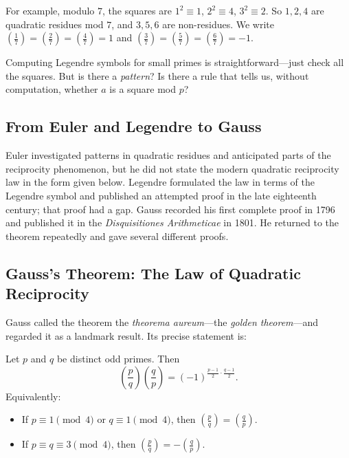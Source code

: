 For example, modulo $7$, the squares are $1^2 \equiv 1$, $2^2 \equiv 4$, $3^2 \equiv 2$. So $1, 2, 4$ are quadratic residues mod $7$, and $3, 5, 6$ are non-residues. We write $\left(\frac{1}{7}\right) = \left(\frac{2}{7}\right) = \left(\frac{4}{7}\right) = 1$ and $\left(\frac{3}{7}\right) = \left(\frac{5}{7}\right) = \left(\frac{6}{7}\right) = -1$.

Computing Legendre symbols for small primes is straightforward---just check all the squares. But is there a \emph{pattern}? Is there a rule that tells us, without computation, whether $a$ is a square mod $p$?

\subsection{From Euler and Legendre to Gauss}

Euler investigated patterns in quadratic residues and anticipated parts of the reciprocity phenomenon, but he did not state the modern quadratic reciprocity law in the form given below. Legendre formulated the law in terms of the Legendre symbol and published an attempted proof in the late eighteenth century; that proof had a gap. Gauss recorded his first complete proof in 1796 and published it in the \emph{Disquisitiones Arithmeticae} in 1801. He returned to the theorem repeatedly and gave several different proofs.

\subsection{Gauss's Theorem: The Law of Quadratic Reciprocity}

Gauss called the theorem the \emph{theorema aureum}---the \emph{golden theorem}---and regarded it as a landmark result. Its precise statement is:

\begin{theorem}\label{thm:quadratic-reciprocity}
Let $p$ and $q$ be distinct odd primes. Then
\[
    \left(\frac{p}{q}\right)\left(\frac{q}{p}\right) = (-1)^{\frac{p-1}{2} \cdot \frac{q-1}{2}}.
\]
Equivalently:
\begin{itemize}
    \item If $p \equiv 1 \pmod{4}$ or $q \equiv 1 \pmod{4}$, then $\left(\frac{p}{q}\right) = \left(\frac{q}{p}\right)$.
    \item If $p \equiv q \equiv 3 \pmod{4}$, then $\left(\frac{p}{q}\right) = -\left(\frac{q}{p}\right)$.
\end{itemize}
\end{theorem}

